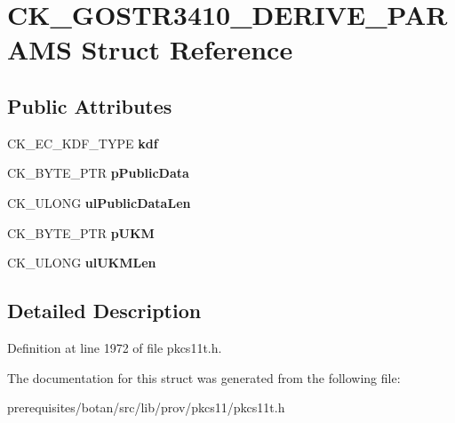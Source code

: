 \hypertarget{struct_c_k___g_o_s_t_r3410___d_e_r_i_v_e___p_a_r_a_m_s}{}\section{C\+K\+\_\+\+G\+O\+S\+T\+R3410\+\_\+\+D\+E\+R\+I\+V\+E\+\_\+\+P\+A\+R\+A\+MS Struct Reference}
\label{struct_c_k___g_o_s_t_r3410___d_e_r_i_v_e___p_a_r_a_m_s}
\subsection*{Public Attributes}
\begin{DoxyCompactItemize}
\item 
\mbox{\label{struct_c_k___g_o_s_t_r3410___d_e_r_i_v_e___p_a_r_a_m_s_abeb306578c915a5d23b3dbae721ee4dd}} 
C\+K\+\_\+\+E\+C\+\_\+\+K\+D\+F\+\_\+\+T\+Y\+PE {\bfseries kdf}
\item 
\mbox{\label{struct_c_k___g_o_s_t_r3410___d_e_r_i_v_e___p_a_r_a_m_s_adec4982ab67437e27ef867081cf086aa}} 
C\+K\+\_\+\+B\+Y\+T\+E\+\_\+\+P\+TR {\bfseries p\+Public\+Data}
\item 
\mbox{\label{struct_c_k___g_o_s_t_r3410___d_e_r_i_v_e___p_a_r_a_m_s_a3edeb032be640b4f4933bb7ff212fc5f}} 
C\+K\+\_\+\+U\+L\+O\+NG {\bfseries ul\+Public\+Data\+Len}
\item 
\mbox{\label{struct_c_k___g_o_s_t_r3410___d_e_r_i_v_e___p_a_r_a_m_s_ad9f68b0129a257cbc624bf94e4b785aa}} 
C\+K\+\_\+\+B\+Y\+T\+E\+\_\+\+P\+TR {\bfseries p\+U\+KM}
\item 
\mbox{\label{struct_c_k___g_o_s_t_r3410___d_e_r_i_v_e___p_a_r_a_m_s_a82e55db5f98418e58dd6b9909eef3849}} 
C\+K\+\_\+\+U\+L\+O\+NG {\bfseries ul\+U\+K\+M\+Len}
\end{DoxyCompactItemize}


\subsection{Detailed Description}


Definition at line 1972 of file pkcs11t.\+h.



The documentation for this struct was generated from the following file\+:\begin{DoxyCompactItemize}
\item 
prerequisites/botan/src/lib/prov/pkcs11/pkcs11t.\+h\end{DoxyCompactItemize}
